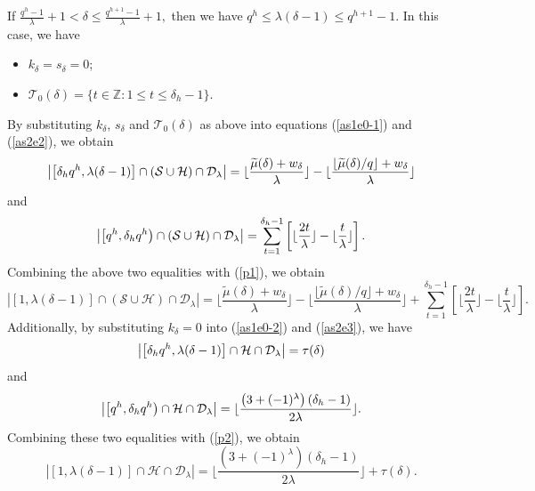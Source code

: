 \documentclass[journal,onecolumn]{IEEEtran}
\begin{document}
If $ \frac{q^h-1}{\lambda}+1<\delta\leq \frac{q^{h+1}-1}{\lambda}+1,$ then we have $q^h\leq \lambda(\delta-1)\leq q^{h+1}-1$. In this case, we have 
\begin{itemize}
    \item $k_{\delta}=s_{\delta}=0$;
    \item $\mathcal{T}_0(\delta)=\{t\in \mathbb{Z}: 1\leq t\leq \delta_h-1\}.$
\end{itemize}
By substituting $k_{\delta}$, $s_{\delta}$ and $\mathcal{T}_0(\delta)$ as above  into equations (\ref{as1e0-1}) and (\ref{as2e2}), we obtain 
\begin{equation}\notag
\left|\left[\delta_h q^h,  \lambda(\delta-1)\right]\cap (\mathcal{S}\cup \mathcal{H})\cap \mathcal{D}_{\lambda}\right|=  \lfloor \frac{\widetilde{\mu}(\delta)+w_{\delta}}{\lambda}\rfloor-\lfloor \frac{\lfloor\widetilde{\mu}(\delta)/q\rfloor+w_{\delta}}{\lambda}\rfloor
\end{equation}
and \begin{equation}\notag
\left|\left[q^h,  \delta_hq^h\right)\cap (\mathcal{S}\cup \mathcal{H})\cap \mathcal{D}_{\lambda}\right|= \sum\limits_{t=1}^{\delta_h-1}\left[ \lfloor \frac{2t}{\lambda}\rfloor -\lfloor \frac{t}{\lambda}\rfloor \right]. 
\end{equation}
Combining the above two equalities with (\ref{p1}),  we obtain 
\begin{equation}\label{485}
\left|\left[1, \lambda(\delta-1)\right]\cap (\mathcal{S}\cup \mathcal{H})\cap \mathcal{D}_{\lambda}\right|= \lfloor \frac{\widetilde{\mu}(\delta)+w_{\delta}}{\lambda}\rfloor-\lfloor \frac{\lfloor\widetilde{\mu}(\delta)/q\rfloor+w_{\delta}}{\lambda}\rfloor + \sum\limits_{t=1}^{\delta_h-1}\left[ \lfloor \frac{2t}{\lambda}\rfloor -\lfloor \frac{t}{\lambda}\rfloor \right]. 
\end{equation}
Additionally, by substituting $k_{\delta}=0$ into (\ref{as1e0-2}) and  (\ref{as2e3}), we have 
\begin{equation}\notag
   \left| \left[ \delta_h q^h,\lambda(\delta-1) \right]\cap \mathcal{H} \cap \mathcal{D}_{\lambda} \right| =\tau(\delta)
\end{equation}
and 
\begin{equation}\notag
    \left|\left[q^h, \delta_hq^h\right)\cap \mathcal{H}\cap \mathcal{D}_{\lambda}\right| =
       \lfloor \frac{\left(3+(-1)^{\lambda}
            \right)(\delta_h-1)}{2\lambda}\rfloor.
\end{equation}
Combining these two equalities with (\ref{p2}), we obtain 
\begin{equation}\label{50}
    \left| \left[1, \lambda(\delta-1)\right]\cap \mathcal{H}\cap \mathcal{D}_{\lambda} \right| = \lfloor \frac{\left(3+(-1)^{\lambda}
            \right)(\delta_h-1)}{2\lambda}\rfloor+\tau(\delta).
\end{equation}
\end{document}
